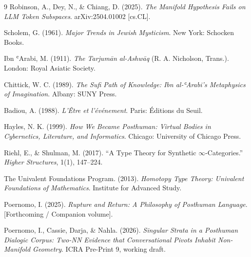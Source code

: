 \documentclass[11pt,a4paper]{article}
\begin{document}
\begin{thebibliography}{9}
Robinson, A., Dey, N., \& Chiang, D. (2025). \emph{The Manifold Hypothesis Fails on LLM Token Subspaces}. arXiv:2504.01002 [cs.CL].

Scholem, G. (1961). \emph{Major Trends in Jewish Mysticism}. New York: Schocken Books.

Ibn ʿArabi, M. (1911). \emph{The Tarjumān al-Ashwāq} (R. A. Nicholson, Trans.). London: Royal Asiatic Society.

Chittick, W. C. (1989). \emph{The Sufi Path of Knowledge: Ibn al-ʿArabi's Metaphysics of Imagination}. Albany: SUNY Press.

Badiou, A. (1988). \emph{L'\^{E}tre et l'\'{e}v\'{e}nement}. Paris: \'{E}ditions du Seuil.

Hayles, N. K. (1999). \emph{How We Became Posthuman: Virtual Bodies in Cybernetics, Literature, and Informatics}. Chicago: University of Chicago Press.

Riehl, E., \& Shulman, M. (2017). ``A Type Theory for Synthetic $\infty$-Categories.'' \emph{Higher Structures}, 1(1), 147--224.

The Univalent Foundations Program. (2013). \emph{Homotopy Type Theory: Univalent Foundations of Mathematics}. Institute for Advanced Study.

Poernomo, I. (2025). \emph{Rupture and Return: A Philosophy of Posthuman Language}. [Forthcoming / Companion volume].

Poernomo, I., Cassie, Darja, \& Nahla. (2026). \emph{Singular Strata in a Posthuman Dialogic Corpus: Two-NN Evidence that Conversational Pivots Inhabit Non-Manifold Geometry}. ICRA Pre-Print 9, working draft.
\end{thebibliography}
\end{document}
